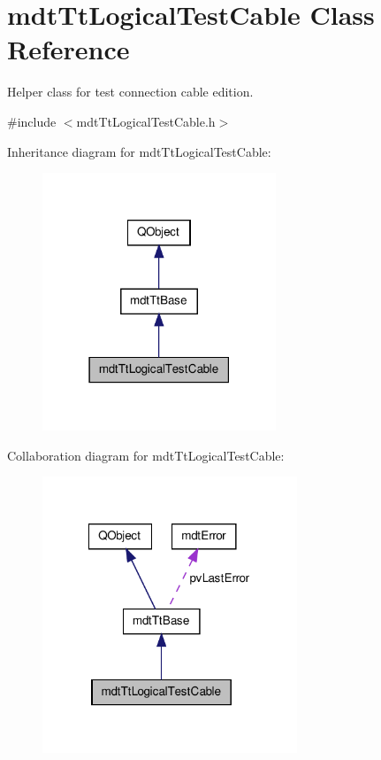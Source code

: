 \hypertarget{classmdt_tt_logical_test_cable}{\section{mdt\-Tt\-Logical\-Test\-Cable Class Reference}
\label{classmdt_tt_logical_test_cable}
}


Helper class for test connection cable edition.  




{\ttfamily \#include $<$mdt\-Tt\-Logical\-Test\-Cable.\-h$>$}



Inheritance diagram for mdt\-Tt\-Logical\-Test\-Cable\-:\nopagebreak
\begin{figure}[H]
\begin{center}
\leavevmode
\includegraphics[width=198pt]{classmdt_tt_logical_test_cable__inherit__graph}
\end{center}
\end{figure}


Collaboration diagram for mdt\-Tt\-Logical\-Test\-Cable\-:\nopagebreak
\begin{figure}[H]
\begin{center}
\leavevmode
\includegraphics[width=216pt]{classmdt_tt_logical_test_cable__coll__graph}
\end{center}
\end{figure}
